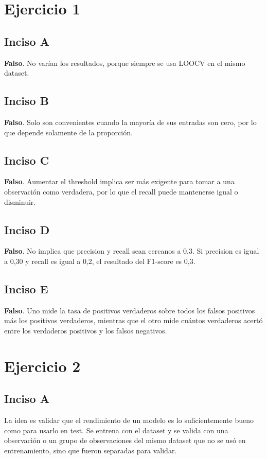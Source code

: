 \documentclass[12pt, a4paper]{article}
\begin{document}
\section*{Ejercicio 1}
\subsection*{Inciso A}
\noindent \textbf{Falso}. No varían los resultados, porque siempre se usa LOOCV en el mismo dataset.

\subsection*{Inciso B}
\noindent \textbf{Falso}. Solo son convenientes cuando la mayoría de sus entradas son cero, por lo que depende solamente de la proporción.

\subsection*{Inciso C}
\noindent \textbf{Falso}. Aumentar el threshold implica ser más exigente para tomar a una observación como verdadera, por lo que el recall puede mantenerse igual o disminuir.

\subsection*{Inciso D}
\noindent \textbf{Falso}. No implica que precision y recall sean cercanos a 0,3. Si precision es igual a 0,30 y recall es igual a 0,2, el resultado del F1-score es 0,3.

\subsection*{Inciso E}
\noindent \textbf{Falso}. Uno mide la tasa de positivos verdaderos sobre todos los falsos positivos más los positivos verdaderos, mientras que el otro mide cuántos verdaderos acertó entre los verdaderos positivos y los falsos negativos.

\section*{Ejercicio 2}
\subsection*{Inciso A}
\noindent La idea es validar que el rendimiento de un modelo es lo suficientemente bueno como para usarlo en test. Se entrena con el dataset y se valida con una observación o un grupo de observaciones del mismo dataset que no se usó en entrenamiento, sino que fueron separadas para validar.
\end{document}

